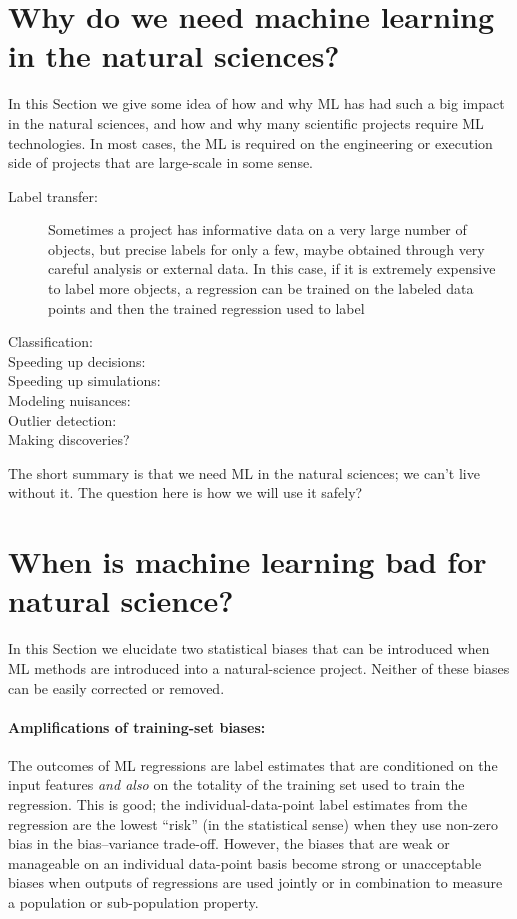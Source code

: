 \documentclass[11pt]{article}
\newcommand{\sectionname}{Section}
\begin{document}
\section{Why do we need machine learning in the natural sciences?}
In this \sectionname{} we give some idea of how and why ML has had such a big impact in the natural sciences, and how and why many scientific projects require ML technologies.
In most cases, the ML is required on the engineering or execution side of projects that are large-scale in some sense.
\begin{description}
  \item[Label transfer:] Sometimes a project has informative data on a very large number of objects, but precise labels for only a few, maybe obtained through very careful analysis or external data.
  In this case, if it is extremely expensive to label more objects, a regression can be trained on the labeled data points and then the trained regression used to label
  \item[Classification:]
  \item[Speeding up decisions:]
  \item[Speeding up simulations:]
  \item[Modeling nuisances:]
  \item[Outlier detection:]
  \item[Making discoveries?]
\end{description}
The short summary is that we need ML in the natural sciences; we can't live without it.
The question here is how we will use it safely?

\section{When is machine learning bad for natural science?}\label{sec:bad}
In this \sectionname{} we elucidate two statistical biases that can be introduced when ML methods are introduced into a natural-science project.
Neither of these biases can be easily corrected or removed.

\paragraph{Amplifications of training-set biases:}
The outcomes of ML regressions are label estimates that are conditioned on the input features \emph{and also} on the totality of the training set used to train the regression.
This is good; the individual-data-point label estimates from the regression are the lowest ``risk'' (in the statistical sense) when they use non-zero bias in the bias--variance trade-off.
However, the biases that are weak or manageable on an individual data-point basis become strong or unacceptable biases when outputs of regressions are used jointly or in combination to measure a population or sub-population property.
\end{document}
